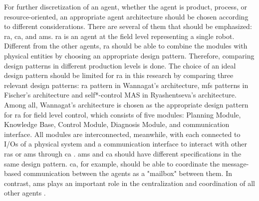 For further discretization of an agent, whether the agent is product, 
process, or resource-oriented, an appropriate agent architecture should 
be chosen according to different considerations. There are several of 
them that should be emphasized: \gls{ra}, \gls{ca}, and \gls{ams}. 
\gls{ra} is an agent at the field level representing a single robot. 
Different from the other agents, \gls{ra} should be able to combine 
the modules with physical entities by choosing an appropriate design 
pattern. Therefore, comparing design patterns in different production 
levels is done\cite{ocker_leveraging_2021}. The choice of an ideal 
design pattern should be limited for \gls{ra} in this research by 
comparing three relevant design patterns:  \gls{ra} pattern in Wannagat’s 
architecture, \gls{mfs} patterns in Fischer’s architecture and 
self*-control 
MAS in Ryashentseva’s architecture. Among all,  Wannagat’s architecture 
is chosen as the appropriate design pattern for \gls{ra} for field level 
control, which consists of five modules: Planning Module, Knowledge Base, 
Control Module, Diagnosis Module, and communication interface. 
All modules are interconnected, meanwhile, with each connected to 
I/Os of a physical system and a communication interface to interact 
with other \gls{ras} or \gls{ams} through \gls{ca} \cite{cruz_salazar_cyber-physical_2019}. 
\gls{ams} and \gls{ca} should have different specifications in the 
same design pattern. \gls{ca}, for example, should be able to coordinate 
the message-based communication between the agents as a "mailbox" 
between them. In contrast, \gls{ams} plays an important role in the 
centralization and coordination of all other agents \cite{wannagat_entwicklung_2010}. 




